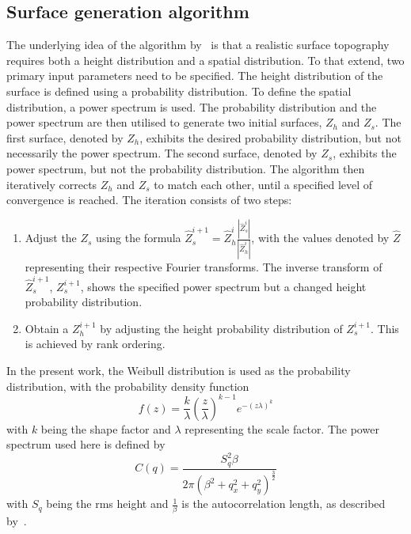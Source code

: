 \subsection{Surface generation algorithm}\label{subsec: Surface generation algorithm}

The underlying idea of the algorithm by~\cite{perez-rafolsGeneratingRandomlyRough2019} is that a realistic surface topography requires both a height distribution and a spatial distribution.
To that extend, two primary input parameters need to be specified.
The height distribution of the surface is defined using a probability distribution.
To define the spatial distribution, a power spectrum is used.
The probability distribution and the power spectrum are then utilised to generate two initial surfaces, $Z_h$ and $Z_s$.
The first surface, denoted by $Z_h$, exhibits the desired probability distribution, but not necessarily the power spectrum.
The second surface, denoted by $Z_s$, exhibits the power spectrum, but not the probability distribution.
The algorithm then iteratively corrects $Z_h$ and $Z_s$ to match each other, until a specified level of convergence is reached.
The iteration consists of two steps:
\begin{enumerate}
    \item Adjust the $Z_s$ using the formula $\hat{Z}_s^{i+1} = \hat{Z}_h^i \frac{|\hat{Z}_s^i|}{|\hat{Z}_h^i|}$, with the values denoted by $\hat{Z}$ representing their respective Fourier transforms.
    The inverse transform of $\hat{Z}_s^{i+1}$, $Z_s^{i+1}$, shows the specified power spectrum but a changed height probability distribution.
    \item Obtain a $Z_h^{i+1}$ by adjusting the height probability distribution of $Z_s^{i+1}$.
    This is achieved by rank ordering.
\end{enumerate}
In the present work, the Weibull distribution is used as the probability distribution, with the probability density function
\begin{equation}\label{eq: Weibull distribution}
    f(z) = \frac{k}{\lambda} \left(\frac{z}{\lambda}\right)^{k-1} e^{-(z\lambda)^{k}}
\end{equation}
with $k$ being the shape factor and $\lambda$ representing the scale factor.
The power spectrum used here is defined by
\begin{equation}\label{eq: Power spectrum}
    C(q) = \frac{S_q^2 \beta}{2\pi\left(\beta^2 + q_x^2+q_y^2\right)^{\frac{3}{2}}}
\end{equation}
with $S_q$ being the rms height and $\frac{1}{\beta}$ is the autocorrelation length, as described by~\cite{perez-rafolsGeneratingRandomlyRough2019}.
